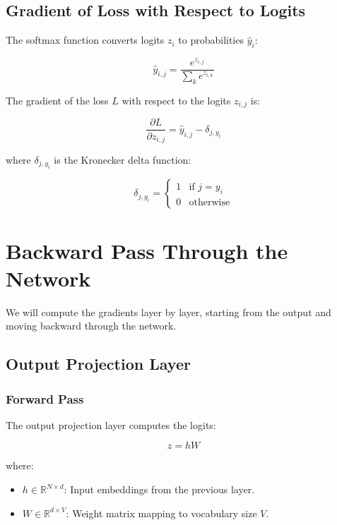 \documentclass{article}
\begin{document}
\subsection{Gradient of Loss with Respect to Logits}

The softmax function converts logits $z_i$ to probabilities $\hat{y}_i$:

\begin{equation}
    \hat{y}_{i, j} = \frac{e^{z_{i, j}}}{\sum_{k} e^{z_{i, k}}}
\end{equation}

The gradient of the loss $L$ with respect to the logits $z_{i, j}$ is:

\begin{equation}
    \frac{\partial L}{\partial z_{i, j}} = \hat{y}_{i, j} - \delta_{j, y_i}
\end{equation}

where $\delta_{j, y_i}$ is the Kronecker delta function:

\[
\delta_{j, y_i} = \begin{cases}
1 & \text{if } j = y_i \\
0 & \text{otherwise}
\end{cases}
\]

\section{Backward Pass Through the Network}

We will compute the gradients layer by layer, starting from the output and moving backward through the network.

\subsection{Output Projection Layer}

\subsubsection{Forward Pass}

The output projection layer computes the logits:

\begin{equation}
    z = h W
\end{equation}

where:

\begin{itemize}
    \item $h \in \mathbb{R}^{N \times d}$: Input embeddings from the previous layer.
    \item $W \in \mathbb{R}^{d \times V}$: Weight matrix mapping to vocabulary size $V$.
\end{itemize}
\end{document}

